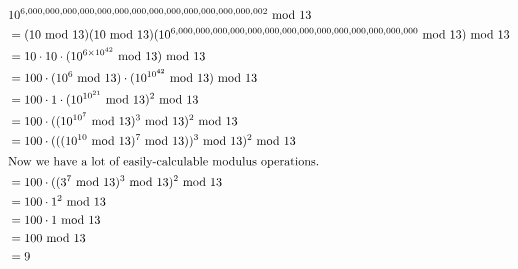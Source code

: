 \documentclass{article}
\renewcommand{\mod}{\text{ mod }}
\begin{document}
\section{}
\begin{align*}
    &  10^{6,000,000,000,000,000,000,000,000,000,000,000,000,000,002} \mod 13 \\
    &= (10 \mod 13)(10 \mod 13)(10^{6,000,000,000,000,000,000,000,000,000,000,000,000,000,000} \mod 13) \mod 13 \\
    &= 10 \cdot 10 \cdot (10^{6\times 10^{42}} \mod 13) \mod 13 \\
    &= 100 \cdot (10^6 \mod 13) \cdot (10^{10^{42}} \mod 13) \mod 13 \\
    &= 100 \cdot 1 \cdot (10^{10^{21}} \mod 13)^2 \mod 13\\
    &= 100 \cdot ((10^{10^7} \mod 13)^3 \mod 13)^2 \mod 13\\
    &= 100 \cdot (((10^{10} \mod 13)^7 \mod 13))^3 \mod 13)^2 \mod 13\\
    \intertext{Now we have a lot of easily-calculable modulus operations.}
    &= 100 \cdot ((3^7 \mod 13)^3 \mod 13)^2 \mod 13\\
    &= 100 \cdot 1^2 \mod 13\\
    &= 100 \cdot 1 \mod 13\\
    &= 100 \mod 13 \\
    &= 9
\end{align*}
\end{document}
